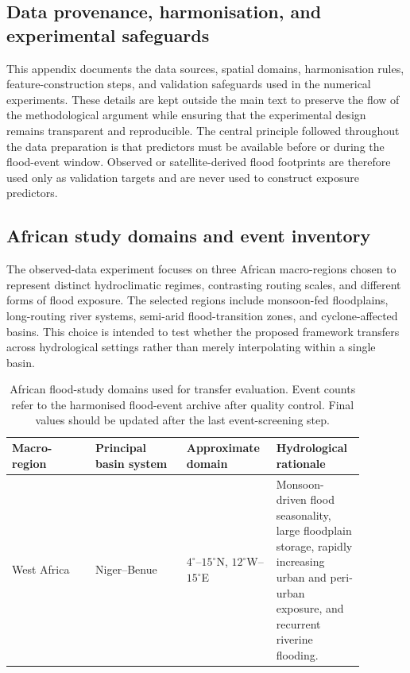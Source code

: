 \documentclass[pdflatex,sn-mathphys-ay]{sn-jnl}
\theoremstyle{thmstyleone}
\theoremstyle{thmstylethree}
\theoremstyle{thmstyletwo}
\begin{document}
\begin{appendices}
\section{Data provenance, harmonisation, and experimental safeguards}
\label{app:data_experimental_details}

This appendix documents the data sources, spatial domains,
harmonisation rules, feature-construction steps, and validation
safeguards used in the numerical experiments.  These details are kept
outside the main text to preserve the flow of the methodological
argument while ensuring that the experimental design remains
transparent and reproducible.  The central principle followed
throughout the data preparation is that predictors must be available
before or during the flood-event window.  Observed or satellite-derived
flood footprints are therefore used only as validation targets and are
never used to construct exposure predictors.

\subsection{African study domains and event inventory}
\label{app:study_domains}

The observed-data experiment focuses on three African macro-regions
chosen to represent distinct hydroclimatic regimes, contrasting
routing scales, and different forms of flood exposure.  The selected
regions include monsoon-fed floodplains, long-routing river systems,
semi-arid flood-transition zones, and cyclone-affected basins.  This
choice is intended to test whether the proposed framework transfers
across hydrological settings rather than merely interpolating within a
single basin.

\begin{table}[t]
\centering
\small
\caption{
African flood-study domains used for transfer evaluation.  Event
counts refer to the harmonised flood-event archive after quality
control.  Final values should be updated after the last event-screening
step.
}
\label{tab:app_study_domains}
\begin{tabular}{p{0.22\linewidth}p{0.24\linewidth}
                p{0.20\linewidth}p{0.22\linewidth}}
\toprule
Macro-region & Principal basin system & Approximate domain
& Hydrological rationale \\
\midrule
West Africa
&
Niger--Benue
&
$4^{\circ}$--$15^{\circ}$N,
$12^{\circ}$W--$15^{\circ}$E
&
Monsoon-driven flood seasonality, large floodplain storage,
rapidly increasing urban and peri-urban exposure, and recurrent
riverine flooding. \\


\end{tabular}
\end{table}
\end{appendices}
\end{document}
